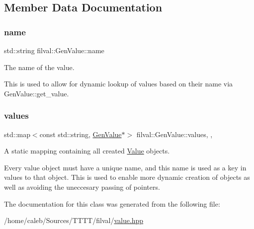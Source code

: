 \subsection{Member Data Documentation}
\hypertarget{classfilval_1_1GenValue_a007e38c03ee041c2a657afa3d6e91ab1}{}\label{classfilval_1_1GenValue_a007e38c03ee041c2a657afa3d6e91ab1} 
\subsubsection{\texorpdfstring{name}{name}}
{\footnotesize\ttfamily std\+::string filval\+::\+Gen\+Value\+::name\hspace{0.3cm}{\ttfamily [private]}}



The name of the value. 

This is used to allow for dynamic lookup of values based on their name via Gen\+Value\+::get\+\_\+value. \hypertarget{classfilval_1_1GenValue_aa94f38a80f5a127bf3df33ad53198e57}{}\label{classfilval_1_1GenValue_aa94f38a80f5a127bf3df33ad53198e57} 
\subsubsection{\texorpdfstring{values}{values}}
{\footnotesize\ttfamily std\+::map$<$const std\+::string, \hyperlink{classfilval_1_1GenValue}{Gen\+Value}$\ast$$>$ filval\+::\+Gen\+Value\+::values\hspace{0.3cm}{\ttfamily [inline]}, {\ttfamily [static]}, {\ttfamily [protected]}}



A static mapping containing all created \hyperlink{classfilval_1_1Value}{Value} objects. 

Every value object must have a unique name, and this name is used as a key in values to that object. This is used to enable more dynamic creation of objects as well as avoiding the uneccesary passing of pointers. 

The documentation for this class was generated from the following file\+:\begin{DoxyCompactItemize}
\item 
/home/caleb/\+Sources/\+T\+T\+T\+T/filval/\hyperlink{value_8hpp}{value.\+hpp}\end{DoxyCompactItemize}
